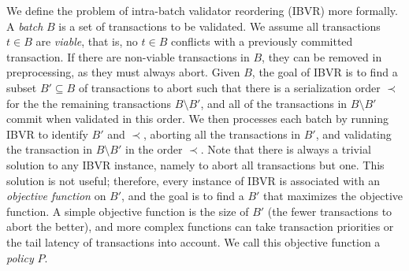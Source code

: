We define the problem of intra-batch validator reordering (IBVR) more formally. A \emph{batch} $B$ is a set of transactions to be validated. We assume all transactions $t \in B$ are \emph{viable}, that is, no $t \in B$ conflicts with a previously committed transaction. If there are non-viable transactions in $B$, they can be removed in preprocessing, as they must always abort.
Given $B$, the goal of IBVR is to find a subset $B' \subseteq B$ of transactions to abort such that there is a serialization order $\prec$ for the 
the remaining transactions $B \setminus B'$, and all of the transactions in $B \setminus B'$ commit when validated in this order.
We then processes each batch by running IBVR to identify $B'$ and $\prec$, aborting all the transactions in $B'$,  and validating the transaction in $B \setminus B'$  
in the order $\prec$. 
Note that there is always a trivial solution to any IBVR instance, namely to abort all transactions but one. 
This solution is not useful; therefore, every instance of
IBVR is associated with an \emph{objective function} on $B'$, and the goal is to
find a $B'$ that maximizes the objective function. A simple objective function
is the size of $B'$ (the fewer transactions to abort the better), and more complex functions can take transaction priorities
or the tail latency of transactions into
account. We call this objective function a \emph{policy} $P$.

